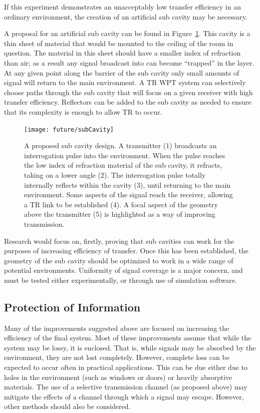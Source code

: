 If this experiment demonstrates an unacceptably low transfer efficiency in an ordinary environment, the creation of an artificial sub cavity may be necessary.

A proposal for an artificial sub cavity can be found in Figure~\ref{fig:subCav}. This cavity is a thin sheet of material that would be mounted to the ceiling of the room in question. The material in this sheet should have a smaller index of refraction than air; as a result any signal broadcast into can become ``trapped'' in the layer. At any given point along the barrier of the sub cavity only small amounts of signal will return to the main environment. A TR WPT system can selectively choose paths through the sub cavity that will focus on a given receiver with high transfer efficiency. Reflectors can be added to the sub cavity as needed to ensure that its complexity is enough to allow TR to occur.

\begin{figure}[h]
\centering
\texttt{[image: future/subCavity]}
\caption[Proposed ``Sub Cavity Design'']{A proposed sub cavity design. A transmitter (1) broadcasts an interrogation pulse into the environment. When the pulse reaches the low index of refraction material of the sub cavity, it refracts, taking on a lower angle (2). The interrogation pulse totally internally reflects within the cavity (3), until returning to the main environment. Some aspects of the signal reach the receiver, allowing a TR link to be established (4). A focal aspect of the geometry above the transmitter (5) is highlighted as a way of improving transmission.}
\label{fig:subCav}
\end{figure}

Research would focus on, firstly, proving that sub cavities can work for the purposes of increasing efficiency of transfer. Once this has been established, the geometry of the sub cavity should be optimized to work in a wide range of potential environments. Uniformity of signal coverage is a major concern, and must be tested either experimentally, or through use of simulation software.

\subsection{Protection of Information}
Many of the improvements suggested above are focused on increasing the efficiency of the final system. Most of these improvements assume that while the system may be lossy, it is enclosed. That is, while signals may be absorbed by the environment, they are not lost completely. However, complete loss can be expected to occur often in practical applications. This can be due either due to holes in the environment (such as windows or doors) or heavily absorptive materials. The use of a selective transmission channel (as proposed above) may mitigate the effects of a channel through which a signal may escape. However, other methods should also be considered.

